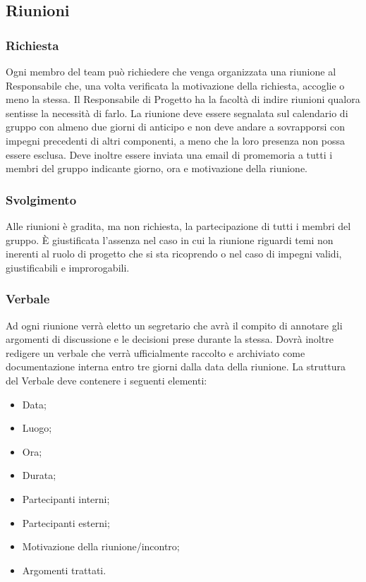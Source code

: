 \subsection{Riunioni}
\label{3.3}

\subsubsection{Richiesta}
\label{3.3.1}
Ogni membro del team può richiedere che venga organizzata una riunione al Responsabile che, una volta verificata la motivazione della richiesta, accoglie o meno la stessa.
Il Responsabile di Progetto ha la facoltà di indire riunioni qualora sentisse la necessità di farlo.
La riunione deve essere segnalata sul calendario di gruppo con almeno due giorni di anticipo e non deve andare a sovrapporsi con impegni precedenti di altri componenti, a meno che la loro presenza non possa essere esclusa. Deve inoltre essere inviata una email di promemoria a tutti i membri del gruppo indicante giorno, ora e motivazione della riunione.

\subsubsection{Svolgimento}
\label{3.3.2}
Alle riunioni è gradita, ma non richiesta, la partecipazione di tutti i membri del gruppo. È giustificata l'assenza nel caso in cui la riunione riguardi temi non inerenti al ruolo di progetto che si sta ricoprendo o nel caso di impegni validi, giustificabili e improrogabili.

\subsubsection{Verbale}
\label{3.3.3}
Ad ogni riunione verrà eletto un segretario che avrà il compito di annotare gli argomenti di discussione e le decisioni prese durante la stessa.
Dovrà inoltre redigere un verbale che verrà ufficialmente raccolto e archiviato come documentazione interna entro tre giorni dalla data della riunione.
La struttura del Verbale deve contenere i seguenti elementi:
\begin{itemize}
\item Data;
\item Luogo;
\item Ora;
\item Durata;
\item Partecipanti interni;
\item Partecipanti esterni;
\item Motivazione della riunione/incontro;
\item Argomenti trattati.
\end{itemize}

